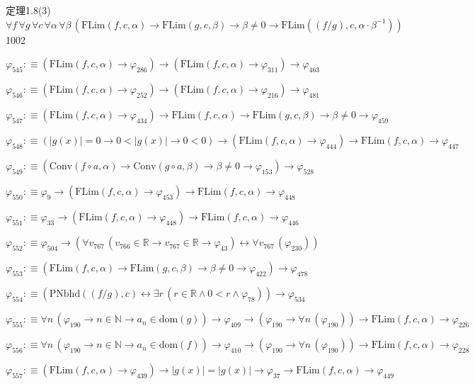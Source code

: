 \begin{fullproof}{定理1.8(3)}{$\forall f\,\forall g\,\forall c\,\forall \alpha\,\forall \beta\,(\mathrm{FLim}(f,c,\alpha) \to \mathrm{FLim}(g,c,\beta) \to \beta \neq 0 \to \mathrm{FLim}((f / g),c,\alpha \cdot \beta^{-1}))$}{1002}
\begin{abbrevlist}
\item $\varphi_{545} :\equiv (\mathrm{FLim}(f,c,\alpha) \to \varphi_{286}) \to (\mathrm{FLim}(f,c,\alpha) \to \varphi_{311}) \to \varphi_{463}$
\item $\varphi_{546} :\equiv (\mathrm{FLim}(f,c,\alpha) \to \varphi_{252}) \to (\mathrm{FLim}(f,c,\alpha) \to \varphi_{216}) \to \varphi_{481}$
\item $\varphi_{547} :\equiv (\mathrm{FLim}(f,c,\alpha) \to \varphi_{434}) \to \mathrm{FLim}(f,c,\alpha) \to \mathrm{FLim}(g,c,\beta) \to \beta \neq 0 \to \varphi_{459}$
\item $\varphi_{548} :\equiv (\lvert g(x) \rvert = 0 \to 0 < \lvert g(x) \rvert \to 0 < 0) \to (\mathrm{FLim}(f,c,\alpha) \to \varphi_{444}) \to \mathrm{FLim}(f,c,\alpha) \to \varphi_{447}$
\item $\varphi_{549} :\equiv (\mathrm{Conv}(f \circ a,\alpha) \to \mathrm{Conv}(g \circ a,\beta) \to \beta \neq 0 \to \varphi_{153}) \to \varphi_{528}$
\item $\varphi_{550} :\equiv \varphi_{9} \to (\mathrm{FLim}(f,c,\alpha) \to \varphi_{453}) \to \mathrm{FLim}(f,c,\alpha) \to \varphi_{448}$
\item $\varphi_{551} :\equiv \varphi_{33} \to (\mathrm{FLim}(f,c,\alpha) \to \varphi_{448}) \to \mathrm{FLim}(f,c,\alpha) \to \varphi_{446}$
\item $\varphi_{552} :\equiv \varphi_{504} \to (\forall v_{767}\,(v_{766} \in \mathbb{R} \to v_{767} \in \mathbb{R} \to \varphi_{43}) \leftrightarrow \forall v_{767}\,(\varphi_{230}))$
\item $\varphi_{553} :\equiv (\mathrm{FLim}(f,c,\alpha) \to \mathrm{FLim}(g,c,\beta) \to \beta \neq 0 \to \varphi_{422}) \to \varphi_{478}$
\item $\varphi_{554} :\equiv (\mathrm{PNbhd}((f / g),c) \leftrightarrow \exists r\,(r \in \mathbb{R} \land 0 < r \land \varphi_{78})) \to \varphi_{534}$
\item $\varphi_{555} :\equiv \forall n\,(\varphi_{190} \to n \in \mathbb{N} \to a_{n} \in \mathrm{dom}(g)) \to \varphi_{409} \to (\varphi_{190} \to \forall n\,(\varphi_{190})) \to \mathrm{FLim}(f,c,\alpha) \to \varphi_{226}$
\item $\varphi_{556} :\equiv \forall n\,(\varphi_{190} \to n \in \mathbb{N} \to a_{n} \in \mathrm{dom}(f)) \to \varphi_{410} \to (\varphi_{190} \to \forall n\,(\varphi_{190})) \to \mathrm{FLim}(f,c,\alpha) \to \varphi_{228}$
\item $\varphi_{557} :\equiv (\mathrm{FLim}(f,c,\alpha) \to \varphi_{439}) \to \lvert g(x) \rvert = \lvert g(x) \rvert \to \varphi_{37} \to \mathrm{FLim}(f,c,\alpha) \to \varphi_{449}$

\end{abbrevlist}
\end{fullproof}
